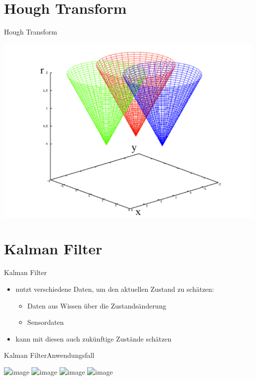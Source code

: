 \documentclass{beamer}
\begin{document}
\section{Hough Transform}

\begin{frame}{Hough Transform}
\begin{center}\includegraphics[scale=1]{img/Hough3.png}\end{center}
\end{frame}

\section{Kalman Filter}

\begin{frame}{Kalman Filter}
\begin{itemize}
\item nutzt verschiedene Daten, um den aktuellen Zustand zu schätzen:
\begin{itemize}
\item Daten aus Wissen über die Zustandsänderung
\item Sensordaten
\end{itemize}
\item kann mit diesen auch zukünftige Zustände schätzen
\end{itemize}
\end{frame}

\begin{frame}{Kalman Filter}{Anwendungsfall}
\begin{center}
\includegraphics<1-1>[scale=0.45]{img/kalman_0_1.jpg}
\includegraphics<2-2>[scale=0.45]{img/kalman_0_2.jpg}
\includegraphics<3-3>[scale=0.45]{img/kalman_0_3.jpg}
\includegraphics<4-4>[scale=0.45]{img/kalman_0_4.jpg}
\end{center}
\end{frame}
\end{document}
